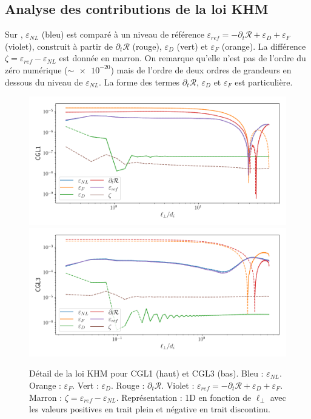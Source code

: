 
\subsection{Analyse des contributions de la loi KHM }

Sur , $\varepsilon_{NL}$ (bleu) est comparé à un niveau de référence $\varepsilon_{ref} =- \partial_t \mathcal{R}  + \varepsilon_{D} + \varepsilon_{F}$ (violet), construit à partir de $\partial_t \mathcal{R}$ (rouge), $\varepsilon_{D}$ (vert) et $\varepsilon_{F}$ (orange). La différence $\zeta = \varepsilon_{ref} - \varepsilon_{NL}$ est donnée en marron. On remarque qu'elle n'est pas de l'ordre du zéro numérique ($\sim \num{e-20}$) mais de l'ordre de deux ordres de grandeurs en dessous du niveau de $\varepsilon_{NL}$.   La forme des termes $\partial_t \mathcal{R}$, $\varepsilon_{D}$ et $\varepsilon_{F}$ est particulière.
\begin{figure}[!ht]
 \centering
\includegraphics[width=0.9\linewidth,trim=0cm 0cm 0cm 0cm, clip=true]{./Part_3/images_ch2/CGL1_1D_lperp_alll}
\includegraphics[width=0.9\linewidth,trim=0cm 0cm 0cm 0cm, clip=true]{./Part_3/images_ch2/CGL3_1D_lperp_alll}
\cprotect\caption{Détail de la loi KHM pour CGL1 (haut) et CGL3 (bas). Bleu : $\varepsilon_{NL}$. Orange : $\varepsilon_{F}$. Vert : $\varepsilon_{D}$. Rouge : $\partial_t \mathcal{R}$. Violet : $\varepsilon_{ref} =- \partial_t \mathcal{R}  + \varepsilon_{D} + \varepsilon_{F}$. Marron : $\zeta = \varepsilon_{ref} - \varepsilon_{NL}$. Représentation : \acs{1D} en fonction de $\ell_{\perp}$ avec les valeurs positives en trait plein et négative en trait discontinu. }
\label{fig:KHM}
\end{figure}


